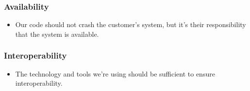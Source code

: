 \subsubsection{Availability}
\begin{itemize}
\item Our code should not crash the customer's system, but it's their responsibility that the system is available.
\end{itemize}

\subsubsection{Interoperability}
\begin{itemize}
\item The technology and tools we're using should be sufficient to ensure interoperability.
\end{itemize}

